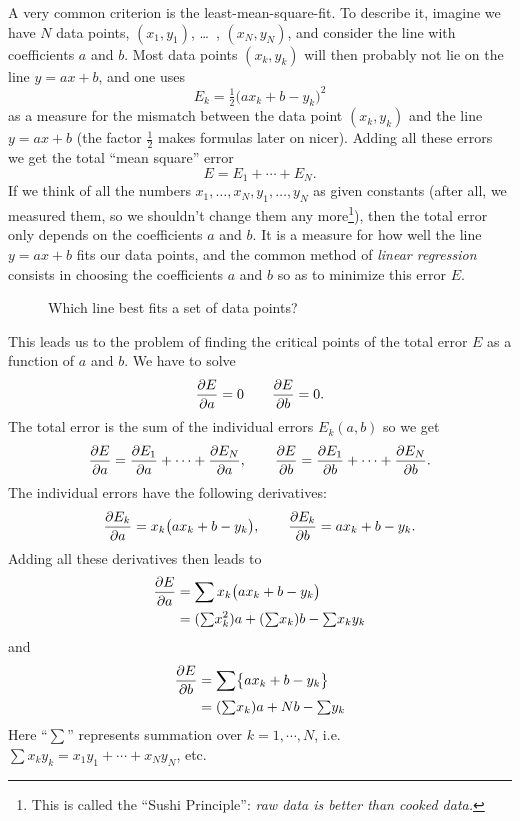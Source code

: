 A very common criterion is the least-mean-square-fit.  To describe it, imagine
we have $N$ data points, $(x_1,y_1)$, \dots\, , $(x_N, y_N)$, and consider the
line with coefficients $a$ and $b$.  Most data points $(x_k, y_k)$ will then
probably not lie on the line $y=ax+b$, and one uses
\[
E_k = \tfrac12\bigl(ax_k+b-y_k\bigr)^2
\]
as a measure for the mismatch between the data point $(x_k, y_k)$ and the line
$y=ax+b$ (the factor $\frac12$ makes formulas later on nicer).  Adding all these
errors we get the total ``mean square'' error
\[
E= E_1 + \cdots + E_N.
\]
If we think of all the numbers $x_1, \ldots, x_N, y_1, \ldots, y_N$ as given
constants (after all, we measured them, so we shouldn't change them any
more\footnote{This is called the ``Sushi Principle'': \textit{raw data is better
    than cooked data.}}), then the total error only depends on the coefficients
$a$ and $b$.  It is a measure for how well the line $y=ax+b$ fits our data
points, and the common method of \emph{linear regression} consists in choosing
the coefficients $a$ and $b$ so as to minimize this error $E$.

\begin{figure}[htb]
  \centering 
  \caption{Which line best fits a set of data points?}
  \label{fig:linear-regression}
\end{figure}

This leads us to the problem of finding the critical points of the total error
$E$ as a function of $a$ and $b$.  We have to solve
\[
\frac{\partial E}{\partial a} = 0 \qquad \frac{\partial E}{\partial b} = 0.
\]
The total error is the sum of the individual errors $E_k(a, b)$ so we get
\[
\frac{\partial E}{\partial a} = \frac{\partial E_1}{\partial a} + \cdots +\frac{\partial E_N}{\partial a}, \qquad \frac{\partial E}{\partial b} = \frac{\partial E_1}{\partial b} + \cdots
+\frac{\partial E_N}{\partial b}.
\]
The individual errors have the following derivatives:
\[
\frac{\partial E_k}{\partial a} = x_k\bigl(ax_k+b-y_k\bigr),\qquad \frac{\partial E_k}{\partial b} = ax_k+b-y_k.
\]
Adding all these derivatives then leads to
\begin{align*}
  \frac{\partial E}{\partial a} &= \sum x_k\bigl(ax_k+b-y_k\bigr) \\
  &= ({\textstyle\sum} x_k^2) a + ({\textstyle\sum} x_k) b - {\textstyle\sum} x_ky_k
\end{align*}
and
\begin{align*}
  \frac{\partial E}{\partial b} &= \sum \bigl\{ax_k+b-y_k\bigr\} \\
  &= ({\textstyle\sum} x_k) a + N b - {\textstyle\sum} y_k
\end{align*}
Here ``$\sum$'' represents summation over $k=1, \cdots, N$, i.e.\ $\sum x_ky_k =
x_1y_1+\cdots+x_Ny_N$, etc.

